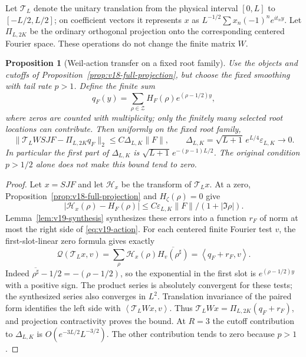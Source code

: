 \documentclass[11pt]{article}
\newtheorem{proposition}[theorem]{Proposition}
\theoremstyle{remark}
\newcommand{\ip}[2]{\left\langle #1,#2\right\rangle}
\newcommand{\Q}{\mathcal Q}
\newcommand{\Z}{\mathcal Z}
\begin{document}
Let $\mathcal T_L$ denote the unitary translation from the physical
interval $[0,L]$ to $[-L/2,L/2]$; on coefficient vectors it represents
$x$ as $L^{-1/2}\sum x_n(-1)^ne^{it_ny}$. Let $\Pi_{L,2K}$
be the ordinary orthogonal projection onto the corresponding centered
Fourier space. These operations do not change the finite matrix $W$.

\begin{proposition}[Weil-action transfer on a fixed root family]
\label{prop:v19-action}
Use the objects and cutoffs of Proposition~\ref{prop:v18-full-projection},
but choose the fixed smoothing with tail rate $p>1$. Define the finite sum
\[
 q_F(y)=\sum_{\rho\in\Z}H_F(\rho)e^{(\rho-1/2)y},
\]
where zeros are counted with multiplicity; only the finitely many
selected root locations can contribute. Then uniformly on the fixed
root family,
\begin{equation}\label{eq:v19-action}
 \|\mathcal T_LWSJF-\Pi_{L,2K}q_F\|_2
 \le C\Delta_{L,K}\|F\|,\qquad
 \Delta_{L,K}=\sqrt{L+1}\,e^{L/4}\varepsilon_{L,K}\longrightarrow0.
\end{equation}
In particular the first part of $\Delta_{L,K}$ is
$\sqrt{L+1}\,e^{-(p-1)L/2}$. The original condition $p>1/2$
alone does not make this bound tend to zero.
\end{proposition}
\begin{proof}
Let $x=SJF$ and let $\mathcal H_x$ be the transform of
$\mathcal T_Lx$. At a zero, Proposition~\ref{prop:v18-full-projection}
and $H_\zeta(\rho)=0$ give
\[
 |\mathcal H_x(\rho)-H_F(\rho)|
       \le C\varepsilon_{L,K}\|F\|/(1+|\Im\rho|).
\]
Lemma~\ref{lem:v19-synthesis} synthesizes these errors into a function
$r_F$ of norm at most the right side of \eqref{eq:v19-action}.
For each centered finite Fourier test $v$, the first-slot-linear
zero formula gives exactly
\[
 \Q(\mathcal T_Lx,v)=\sum_\rho\mathcal H_x(\rho)
          \overline{H_v(\rho^\sharp)}
       =\ip{q_F+r_F}{v}.
\]
Indeed $\overline{\rho^\sharp}-1/2=-(\rho-1/2)$, so the
exponential in the first slot is $e^{(\rho-1/2)y}$ with a positive
sign. The product series is absolutely convergent for these tests;
the synthesized series also converges in $L^2$. Translation invariance
of the paired form identifies the left side with
$\ip{\mathcal T_LWx}{v}$. Thus
$\mathcal T_LWx=\Pi_{L,2K}(q_F+r_F)$, and projection contractivity
proves the bound. At $R=3$ the cutoff contribution to $\Delta_{L,K}$
is $O(e^{-3L/2}L^{-3/2})$. The other contribution tends to zero
because $p>1$.
\end{proof}
\end{document}
